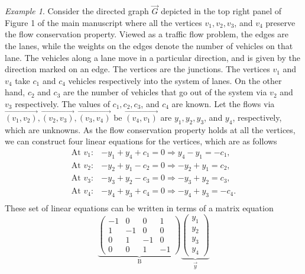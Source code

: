 \documentclass[%
 reprint,
 superscriptaddress,
 amsmath,amssymb,
 aps,
 pra,
floatfix,
nofootinbib,
]{revtex4-2}
\theoremstyle{definition}
\theoremstyle{remark}
\newtheorem{example}{Example}
\begin{document}
\begin{appendix}
\begin{example} \label{ex2} 
Consider the directed graph $\overrightarrow{G}$ depicted in the top right panel of Figure 1 of the main manuscript where all the vertices $v_1, v_2, v_3$, and $v_4$ preserve the flow conservation property. Viewed as a traffic flow problem, the edges are the lanes, while the weights on the edges denote the number of vehicles on that lane. The vehicles along a lane move in a particular direction, and is given by the direction marked on an edge. The vertices are the junctions. The vertices $v_1$ and $v_4$ take $c_1$ and $c_4$ vehicles respectively into the system of lanes. On the other hand, $c_2$ and $c_3$ are the number of vehicles that go out of the system via $v_2$ and $v_3$ respectively. The values of $c_1, c_2, c_3$, and $c_4$ are known. Let the flows via $\overrightarrow{(v_1, v_2)}, \overrightarrow{(v_2, v_3)}, \overrightarrow{(v_3, v_4)}$ be $\overrightarrow{(v_4, v_1)}$ are $y_1, y_2, y_3$, and $y_4$, respectively, which are unknowns. As the flow conservation property holds at all the vertices, we can construct four linear equations for the vertices, which are as follows 
\begin{equation}
    \begin{split}
    \text{At\ } v_1: & -y_1+y_4+c_1=0 \Rightarrow y_4-y_1 =-c_1, \\
    \text{At\ } v_2: & -y_2+y_1 - c_2= 0 \Rightarrow -y_2+y_1=c_2, \\
    \text{At\ } v_3: & -y_3+y_2 - c_3= 0 \Rightarrow -y_3+y_2=c_3,\\
     \text{At\ } v_4: & -y_4+y_3 + c_4= 0 \Rightarrow -y_4+y_3=-c_4.\\
     \end{split}
\end{equation}
These set of linear equations can be written in terms of a matrix equation 
\begin{equation}
\underbrace{ 
\begin{pmatrix}
     -1 & 0 & 0 & 1 \\
     1 & -1 & 0 & 0 \\
     0 & 1 & -1 & 0 \\
     0 & 0 & 1 & -1
 \end{pmatrix} }_{\text{B}}
\underbrace{\begin{pmatrix}
        y_1 \\
        y_2 \\
        y_3 \\
        y_4
    \end{pmatrix}}_{\vec{y}}

\end{equation}
\end{example}
\end{appendix}
\end{document}
